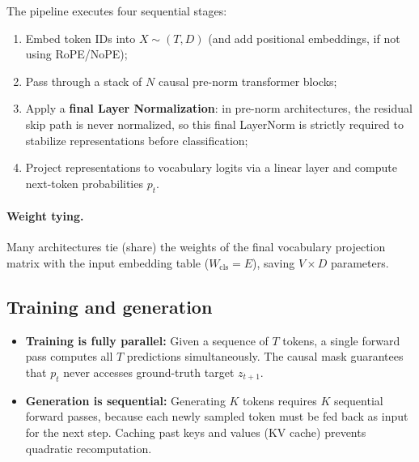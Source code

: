 \documentclass[11pt,a4paper]{article}
\newcommand{\slides}[1]{\par\nopagebreak\noindent{\normalfont\small\emph{(slides #1)}}\par\nopagebreak\vspace{2pt}}
\theoremstyle{definition}
\theoremstyle{plain}
\begin{document}
The pipeline executes four sequential stages:
\begin{enumerate}[nosep]
\item Embed token IDs into $X \sim (T, D)$ (and add positional embeddings, if not using RoPE/NoPE);
\item Pass through a stack of $N$ causal pre-norm transformer blocks;
\item Apply a \textbf{final Layer Normalization}: in pre-norm architectures, the residual skip path is never normalized, so this final LayerNorm is strictly required to stabilize representations before classification;
\item Project representations to vocabulary logits via a linear layer and compute next-token probabilities $p_t$.
\end{enumerate}
\paragraph{Weight tying.}
Many architectures tie (share) the weights of the final vocabulary projection matrix with the input embedding table ($W_{\text{cls}} = E$), saving $V \times D$ parameters.

\subsection{Training and generation}\slides{62 / 84}
\begin{itemize}
\item \textbf{Training is fully parallel:} Given a sequence of $T$ tokens, a single forward pass computes all $T$ predictions simultaneously. The causal mask guarantees that $p_t$ never accesses ground-truth target $z_{t+1}$.
\item \textbf{Generation is sequential:} Generating $K$ tokens requires $K$ sequential forward passes, because each newly sampled token must be fed back as input for the next step. Caching past keys and values (KV cache) prevents quadratic recomputation.
\end{itemize}
\end{document}
